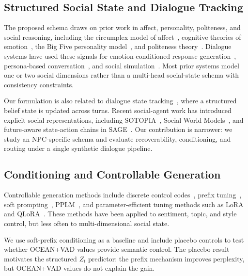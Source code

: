 \documentclass[11pt]{article}
\begin{document}
\subsection{Structured Social State and Dialogue Tracking}

The proposed schema draws on prior work in affect, personality, politeness, and social reasoning, including the circumplex model of affect~\cite{russell1980circumplex}, cognitive theories of emotion~\cite{oatley1987towards}, the Big Five personality model~\cite{digman1990personality}, and politeness theory~\cite{brown1987politeness}.
Dialogue systems have used these signals for emotion-conditioned response generation~\cite{zhou2018emotional}, persona-based conversation~\cite{li2016persona}, and social simulation~\cite{gunkel2011computational}.
Most prior systems model one or two social dimensions rather than a multi-head social-state schema with consistency constraints.

Our formulation is also related to dialogue state tracking~\cite{mrksic2017neural,feng2023dialogue,jacqmin2024dialoguestate}, where a structured belief state is updated across turns.
Recent social-agent work has introduced explicit social representations, including SOTOPIA~\cite{zhou2024sotopia}, Social World Models~\cite{zhou2025social}, and future-aware state-action chains in SAGE~\cite{sage2025steering}.
Our contribution is narrower: we study an NPC-specific schema and evaluate recoverability, conditioning, and routing under a single synthetic dialogue pipeline.

\subsection{Conditioning and Controllable Generation}

Controllable generation methods include discrete control codes~\cite{keskar2019ctrl}, prefix tuning~\cite{li2021prefix}, soft prompting~\cite{lester2021power}, PPLM~\cite{dathathri2020plug}, and parameter-efficient tuning methods such as LoRA~\cite{hu2021lora} and QLoRA~\cite{dettmers2023qlora}.
These methods have been applied to sentiment, topic, and style control, but less often to multi-dimensional social state.

We use soft-prefix conditioning as a baseline and include placebo controls to test whether OCEAN+VAD values provide semantic control.
The placebo result motivates the structured $Z_t$ predictor: the prefix mechanism improves perplexity, but OCEAN+VAD values do not explain the gain.
\end{document}
